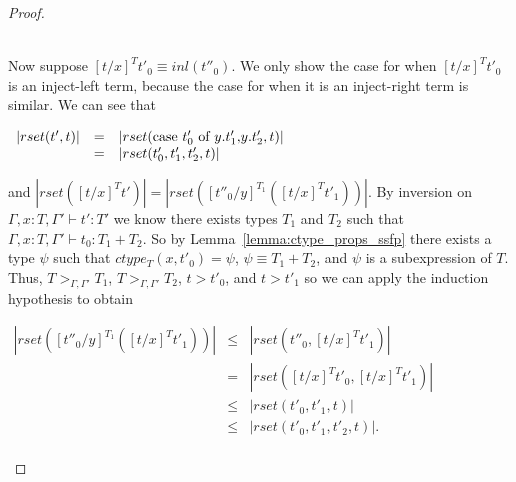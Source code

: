\begin{proof}
\begin{itemize}
  \ \\
  Now suppose $[t/x]^T t'_0 \equiv inl(t''_0)$.  We only show the case for when $[t/x]^T t'_0$ is an inject-left
  term, because the case for when it is an inject-right term is similar.  We can see that 
  \begin{center}
    \begin{math}
      \begin{array}{lll}
        |rset(t',t)| & = & |rset(\mbox{case}\ t'_0\ \text{of}\ y\text{.}t'_1\text{,}y\text{.}t'_2,t)|\\
        & = & |rset(t'_0,t'_1,t'_2,t)|
      \end{array}
    \end{math}
  \end{center}
  and $|rset([t/x]^T t')| = |rset([t''_0/y]^{T_1} ([t/x]^T t'_1))|$.    By inversion on $\Gamma,x:T,\Gamma' \vdash t':T'$ we know there exists
  types $T_1$ and $T_2$ such that $\Gamma,x:T,\Gamma' \vdash t_0:T_1+T_2$.
  So by Lemma~\ref{lemma:ctype_props_ssfp} there exists a type $\psi$ such that $ctype_T (x,t'_0) = \psi$, $\psi \equiv T_1+T_2$, and $\psi$ is a 
  subexpression of $T$.  Thus, $T >_{\Gamma,\Gamma'} T_1$, $T >_{\Gamma,\Gamma'} T_2$, $t > t'_0$, and $t > t'_1$ so we can apply the induction hypothesis
  to obtain 
  \begin{center}
    \begin{math}
      \begin{array}{lll}
        |rset([t''_0/y]^{T_1} ([t/x]^T t'_1))| & \leq & |rset(t''_0,[t/x]^T t'_1)|\\
        & =    & |rset([t/x]^T t'_0,[t/x]^T t'_1)|\\
        & \leq & |rset(t'_0, t'_1, t)|\\
        & \leq & |rset(t'_0, t'_1, t'_2, t)|.\\
      \end{array}
    \end{math}
  \end{center}
    

\end{itemize}
\end{proof}
